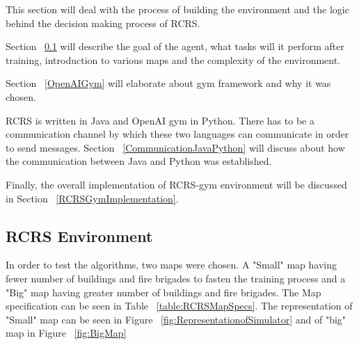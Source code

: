 \documentclass[12pt]{report}
\begin{document}
This section will deal with the process of building the environment and the logic behind the decision making process of RCRS. 

Section ~\ref{RCRSEnvironment} will describe the goal of the agent, what tasks will it perform after training, introduction to various maps and the complexity of the environment. 

Section ~\ref{OpenAIGym} will elaborate about gym framework and why it was chosen.

RCRS is written in Java and OpenAI gym in Python. There has to be a communication channel by which these two languages can communicate in order to send messages. Section ~\ref{CommunicationJavaPython} will discuss about how the communication between Java and Python was established. 

Finally, the overall implementation of RCRS-gym environment will be discussed in Section ~\ref{RCRSGymImplementation}. 





\subsection{RCRS Environment} \label{RCRSEnvironment}


In order to test the algorithms, two maps were chosen. A "Small" map having fewer number of buildings and fire brigades to fasten the training process and a "Big" map having greater number of buildings and fire brigades. The Map specification can be seen in Table ~\ref{table:RCRSMapSpecs}. The representation of "Small" map can be seen in Figure ~\ref{fig:RepresentationofSimulator} and of "big" map in Figure ~\ref{fig:BigMap}
\end{document}
